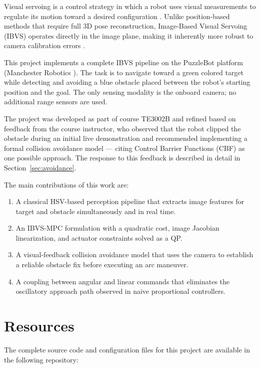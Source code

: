 \documentclass[journal, 10pt]{IEEEtran}
\begin{document}
Visual servoing is a control strategy in which a robot uses visual
measurements to regulate its motion toward a desired configuration
\cite{chaumette2006}. Unlike position-based methods that require full 3D
pose reconstruction, Image-Based Visual Servoing (IBVS) operates directly
in the image plane, making it inherently more robust to camera calibration
errors \cite{chaumette2007}.

This project implements a complete IBVS pipeline on the PuzzleBot platform
(Manchester Robotics \cite{manchester}). The task is to navigate toward a
green colored target while detecting and avoiding a blue obstacle placed
between the robot's starting position and the goal. The only sensing
modality is the onboard camera; no additional range sensors are used.

The project was developed as part of course TE3002B and refined based on
feedback from the course instructor, who observed that the robot clipped
the obstacle during an initial live demonstration and recommended
implementing a formal collision avoidance model --- citing Control Barrier
Functions (CBF) as one possible approach. The response to this feedback is
described in detail in Section~\ref{sec:avoidance}.

The main contributions of this work are:
\begin{enumerate}
  \item A classical HSV-based perception pipeline that extracts image
        features for target and obstacle simultaneously and in real time.
  \item An IBVS-MPC formulation with a quadratic cost, image Jacobian
        linearization, and actuator constraints solved as a QP.
  \item A visual-feedback collision avoidance model that uses the camera
        to establish a reliable obstacle fix before executing an arc
        maneuver.
  \item A coupling between angular and linear commands that eliminates
        the oscillatory approach path observed in naive proportional
        controllers.
\end{enumerate}

\section{Resources}
\label{sec:resources}

The complete source code and configuration files for this project are
available in the following repository:
\end{document}

